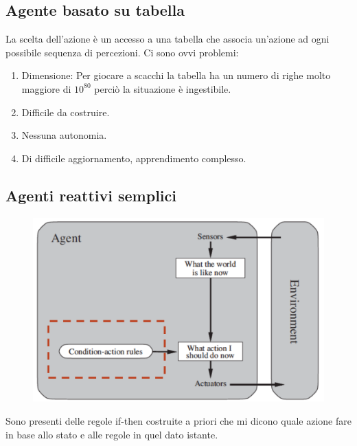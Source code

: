 \documentclass{article}
\begin{document}
\subsection{Agente basato su tabella}
La scelta dell'azione è un accesso a una tabella che associa un’azione ad ogni possibile sequenza di percezioni. Ci sono ovvi problemi:
\begin{enumerate}
    \item Dimensione: Per giocare a scacchi la tabella ha un numero di righe molto maggiore di $10^{80}$ perciò la situazione è ingestibile.
    \item Difficile da costruire.
    \item Nessuna autonomia.
    \item Di difficile aggiornamento, apprendimento complesso.
\end{enumerate}

\subsection{Agenti reattivi semplici}
\begin{figure}[H]
    \centering
    \includegraphics[scale=0.4]{Images/agentireattivisemplici.png}
\end{figure}
Sono presenti delle regole if-then costruite a priori che mi dicono quale azione fare in base allo stato e alle regole in quel dato istante.
\clearpage
\end{document}
